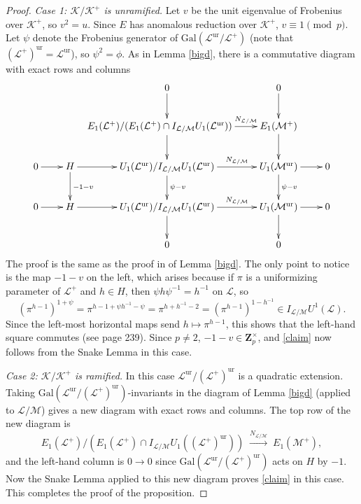 \documentclass[reqno]{amsart}
\theoremstyle{definition}
\def\Z{\mathbf{Z}}
\def\Zp{\Z_p}
\def\K{\mathcal{K}}
\def\L{\mathcal{L}}
\def\M{\mathcal{M}}
\def\Gal{\mathrm{Gal}}
\def\unr{\mathrm{ur}}
\def\map#1{\;\xrightarrow{#1}\;}
\begin{document}
\begin{proof}
{\em Case 1: $\K/\K^+$ is unramified.}
Let $v$ be the unit eigenvalue of Frobenius over $\K^+$, so $v^2 = u$.  
Since $E$ has anomalous reduction over $\K^+$, $v \equiv 1 \pmod{p}$.  
Let $\psi$ denote the Frobenius generator of 
$\Gal(\L^\unr/\L^+)$ (note that $(\L^+)^\unr = \L^\unr$), so $\psi^2 = \phi$.
As in Lemma \ref{bigd}, there is a commutative diagram with exact rows and columns
$$
\xymatrix@C=22pt{
&& 0 \ar[d] & 0 \ar[d] \\
&& \hskip -15pt E_1(\L^+)/(E_1(\L^+) \cap I_{\L/\M} U_1(\L^\unr)) 
    \ar^-{N_{\L/\M}}[r]\ar[d] & E_1(\M^+) \ar[d] \\
0 \ar[r] & H \ar[r] \ar^{-1-v}[d] & U_1(\L^\unr)/I_{\L/\M} U_1(\L^\unr) 
    \ar^-{N_{\L/\M}}[r]\ar^{\psi-v}[d] & U_1(\M^\unr) \ar[r]\ar^{\psi-v}[d] & 0 \\
0 \ar[r] & H \ar[r] & U_1(\L^\unr)/I_{\L/\M} U_1(\L^\unr) 
    \ar^-{N_{\L/\M}}[r]\ar[d] & U_1(\M^\unr) \ar[r]\ar[d] & 0 \\
&& 0 & 0
}
$$
The proof is the same as the proof in \cite{luro} of Lemma \ref{bigd}.  
The only point to notice is the map $-1-v$ on the left, which arises because 
if $\pi$ is a uniformizing parameter of $\L^+$ and $h \in H$, then 
$\psi h \psi^{-1} = h^{-1}$ on $\L$, so 
$$
(\pi^{h-1})^{1+\psi} = \pi^{h - 1 + \psi h^{-1}-\psi} = \pi^{h+h^{-1}-2} 
    = (\pi^{h-1})^{1-h^{-1}} \in I_{\L/\M}U^1(\L).
$$
Since the left-most horizontal maps send $h \mapsto \pi^{h-1}$, this shows that the 
left-hand square commutes (see \cite{luro} page 239).
Since $p \ne 2$, $-1-v \in \Zp^\times$, and \eqref{claim} now follows from the Snake Lemma 
in this case.  

{\em Case 2: $\K/\K^+$ is ramified.}
In this case $\L^\unr/(\L^+)^\unr$ is a quadratic extension.  
Taking $\Gal(\L^\unr/(\L^+)^\unr)$-invariants in the diagram of Lemma 
\ref{bigd} (applied to $\L/\M$) 
gives a new diagram with exact rows and columns.  
The top row of the new diagram is 
$$
E_1(\L^+)/(E_1(\L^+) \cap I_{\L/\M} U_1((\L^+)^\unr)) \map{N_{\L/\M}} E_1(\M^+),
$$
and the left-hand column is $0 \to 0$
since $\Gal(\L^\unr/(\L^+)^\unr)$ acts on $H$ by $-1$.  
Now the Snake Lemma applied to 
this new diagram proves \eqref{claim} in this case.  
This completes the proof of the proposition.
\end{proof}
\end{document}
